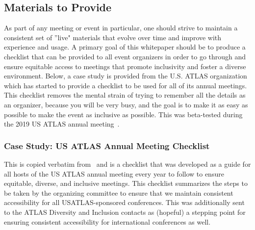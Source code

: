 \documentclass{article}
\begin{document}
  \subsection{Materials to Provide}

  As part of any meeting or event in particular, one should strive to maintain a consistent set of ''live" materials that evolve over time and improve with experience and usage. A primary goal of this whitepaper should be to produce a checklist that can be provided to all event organizers in order to go through and ensure equitable access to meetings that promote inclusivity and foster a diverse environment. Below, a case study is provided from the U.S. ATLAS organization which has started to provide a checklist to be used for all of its annual meetings. This checklist removes the mental strain of trying to remember all the details as an organizer, because you will be very busy, and the goal is to make it as easy as possible to make the event as inclusive as possible. This was beta-tested during the 2019 US ATLAS annual meeting~\cite{USATLASAnnualMeeting2019}.

  \subsubsection{Case Study: US ATLAS Annual Meeting Checklist}

  This is copied verbatim from~\cite{USATLASChecklist} and is a checklist that was developed as a guide for all hosts of the US ATLAS annual meeting every year to follow to ensure equitable, diverse, and inclusive meetings. This checklist summarizes the steps to be taken by the organizing committee to ensure that we maintain consistent accessibility for all USATLAS-sponsored conferences. This was additionally sent to the ATLAS Diversity and Inclusion contacts as (hopeful) a stepping point for ensuring consistent accessibility for international conferences as well.
\end{document}
